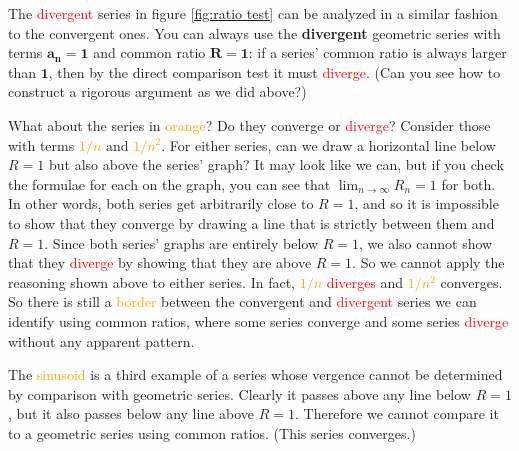 \documentclass{myarticle}
\theoremstyle{nospace}
\newtheorem{old series theorem}{Theorem}
\newenvironment{series theorem}{\begin{mdframed}\begin{old series theorem}}{\end{old series theorem}\end{mdframed}}
\begin{document}
The \textcolor{red}{divergent} series in figure \ref{fig:ratio test} can be analyzed in a similar fashion to the \textcolor{nicegreen}{convergent} ones. You can always use the \textbf{divergent} geometric series with terms $\mathbf{a_n = 1}$ and common ratio $\mathbf{R = 1}$: if a series' common ratio is always larger than $\mathbf{1}$, then by the direct comparison test it must \textcolor{red}{diverge}. (Can you see how to construct a rigorous argument as we did above?)

What about the series in \textcolor{orange}{orange}? Do they \textcolor{nicegreen}{converge} or \textcolor{red}{diverge}? Consider those with terms \textcolor{orange}{$1/n$} and \textcolor{orange}{$1/n^2$}. For either series, can we draw a horizontal line below $R = 1$ but also above the series' graph? It may look like we can, but if you check the formulae for each on the graph, you can see that $\lim_{n \to \infty} R_n = 1$ for both. In other words, both series get arbitrarily close to $R = 1$, and so it is impossible to show that they \textcolor{nicegreen}{converge} by drawing a line that is strictly between them and $R = 1$. Since both series' graphs are entirely below $R = 1$, we also cannot show that they \textcolor{red}{diverge} by showing that they are above $R = 1$. So we cannot apply the reasoning shown above to either series. In fact, \textcolor{orange}{$1/n$} \textcolor{red}{diverges} and \textcolor{orange}{$1/n^2$} \textcolor{nicegreen}{converges}. So there is still a \textcolor{orange}{border} between the \textcolor{nicegreen}{convergent} and \textcolor{red}{divergent} series we can identify using common ratios, where some series \textcolor{nicegreen}{converge} and some series \textcolor{red}{diverge} without any apparent pattern.

The \textcolor{orange}{sinusoid} is a third example of a series whose vergence cannot be determined by comparison with geometric series. Clearly it passes above any line below $R = 1$, but it also passes below any line above $R = 1$. Therefore we cannot compare it to a geometric series using common ratios. (This series converges.)
\end{document}
